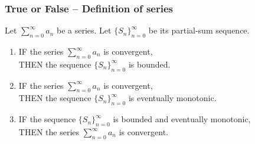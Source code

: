 \documentclass[14pt]{beamer}
\begin{document}
\begin{frame}[t]
	\fontsize{12}{12}\selectfont
	\frametitle{True or False -- Definition of series}

	Let $\displaystyle \sum_{n=0}^{\infty}a_{n}$ be a series. Let
	$\displaystyle \{ S_{n}\}_{n=0}^{\infty}$ be its partial-sum sequence.

	\begin{enumerate}
		\item IF {\color{blue} the series $\displaystyle \sum_{n=0}^{\infty}a_{n}$ is convergent},
			\\ THEN
			{\color{red} the sequence $\displaystyle \{ S_{n}\}_{n=0}^{\infty}$ is bounded}.
			\vspace{.5cm}

		\item IF {\color{blue} the series $\displaystyle \sum_{n=0}^{\infty}a_{n}$ is convergent},
			\\ THEN
			{\color{red} the sequence $\displaystyle \{ S_{n}\}_{n=0}^{\infty}$ is eventually monotonic}.
			\vspace{.8cm}

		\item IF {\color{red} the sequence $\displaystyle \{ S_{n}\}_{n=0}^{\infty}$ is bounded and eventually monotonic},
			\\ THEN
			{\color{blue} the series $\displaystyle \sum_{n=0}^{\infty}a_{n}$ is convergent}.
	\end{enumerate}
\end{frame}
\end{document}
